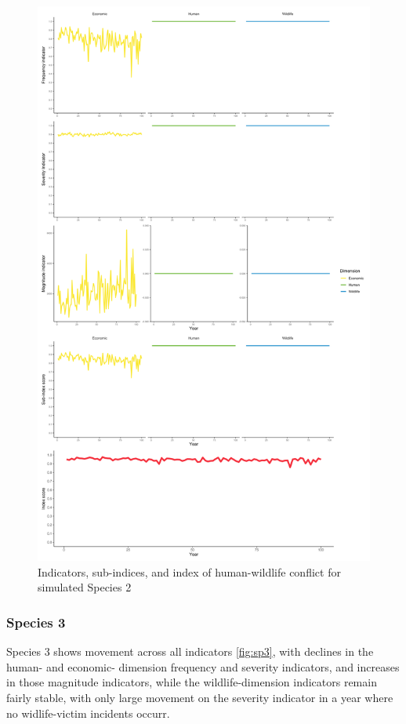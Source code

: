 \documentclass[fleqn,10pt]{olplainarticle}
\begin{document}
\begin{figure}
    \centering
    \includegraphics[width = 1\textwidth]{sp2_all.png}
    \caption{Indicators, sub-indices, and index of human-wildlife conflict for simulated Species 2}
    \label{fig:sp2}
\end{figure}

\subsubsection*{Species 3}
Species 3 shows movement across all indicators \ref{fig:sp3}, with declines in the human- and economic- dimension frequency and severity indicators, and increases in those magnitude indicators, while the wildlife-dimension indicators remain fairly stable, with only large movement on the severity indicator in a year where no widlife-victim incidents occurr.
\end{document}
